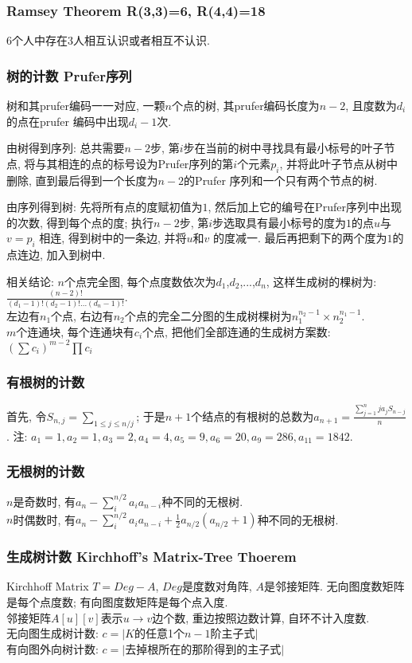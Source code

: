 \subsubsection{Ramsey Theorem R(3,3)=6, R(4,4)=18}
    $6$个人中存在$3$人相互认识或者相互不认识.

\subsubsection{树的计数 Prufer序列}
    树和其prufer编码一一对应, 一颗$n$个点的树, 其prufer编码长度为${n-2}$, 且度数为$d_i$ 的点在prufer 编码中出现${d_i -1}$次. 
    \par 由树得到序列: 总共需要$n-2$步, 第$i$步在当前的树中寻找具有最小标号的叶子节点, 将与其相连的点的标号设为Prufer序列的第$i$个元素$p_i$, 并将此叶子节点从树中删除, 直到最后得到一个长度为$n-2$的Prufer 序列和一个只有两个节点的树. 
    \par 由序列得到树: 先将所有点的度赋初值为$1$, 然后加上它的编号在Prufer序列中出现的次数, 得到每个点的度; 执行$n-2$步, 第$i$步选取具有最小标号的度为$1$的点$u$与$v=p_i$ 相连, 得到树中的一条边, 并将$u$和$v$ 的度减一. 最后再把剩下的两个度为$1$的点连边, 加入到树中. 
    \par 相关结论: $n$个点完全图, 每个点度数依次为$d_1$,$d_2$,...,$d_n$, 这样生成树的棵树为: ${\frac{(n-2)!}{(d_1-1)!(d_2-1)!...(d_n-1)!}}$.\\
    左边有$n_1$个点, 右边有$n_2$个点的完全二分图的生成树棵树为$n_1^{n_2-1}\times n_2^{n_1-1}$. \\
    $m$个连通块, 每个连通块有$c_i$个点, 把他们全部连通的生成树方案数: $(\sum c_i)^{m-2}\prod c_i$
\subsubsection{有根树的计数}\noindent
    首先, 令$S_{n,j}=\sum_{1\leq j\leq n/j}$; 于是$n+1$个结点的有根树的总数为$ a_{n+1}=\frac{\sum_{j=1}^nja_jS_{n-j}}{n}$. 注: $a_1=1,a_2=1,a_3=2,a_4=4,a_5=9,a_6=20,a_9=286,a_{11}=1842$. 
\subsubsection{无根树的计数}\noindent
    $n$是奇数时, 有$a_n-\sum_{i}^{n/2}a_ia_{n-i}$种不同的无根树. \\
    $n$时偶数时, 有$a_n-\sum_{i}^{n/2}a_ia_{n-i}+\frac{1}{2}a_{n/2}(a_{n/2}+1)$种不同的无根树. 
\subsubsection{生成树计数 Kirchhoff's Matrix-Tree Thoerem}
    Kirchhoff Matrix $T=Deg-A$, $Deg$是度数对角阵, $A$是邻接矩阵. 无向图度数矩阵是每个点度数; 有向图度数矩阵是每个点入度.\\
    邻接矩阵$A[u][v]$表示$u\rightarrow v$边个数, 重边按照边数计算, 自环不计入度数.\\
    无向图生成树计数: $c=|K$的任意1个$n−1$阶主子式$|$\\
    有向图外向树计数: $c=|$去掉根所在的那阶得到的主子式$|$
